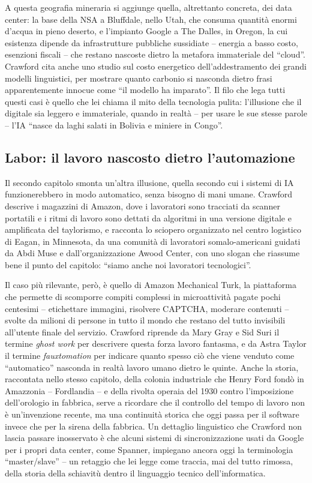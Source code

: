 \documentclass[a4paper,11pt]{article}
\begin{document}
A questa geografia mineraria si aggiunge quella, altrettanto concreta, dei data center: la base della NSA a Bluffdale, nello Utah, che consuma quantità enormi d'acqua in pieno deserto, e l'impianto Google a The Dalles, in Oregon, la cui esistenza dipende da infrastrutture pubbliche sussidiate -- energia a basso costo, esenzioni fiscali -- che restano nascoste dietro la metafora immateriale del ``cloud''. Crawford cita anche uno studio sul costo energetico dell'addestramento dei grandi modelli linguistici, per mostrare quanto carbonio si nasconda dietro frasi apparentemente innocue come ``il modello ha imparato''. Il filo che lega tutti questi casi è quello che lei chiama il mito della tecnologia pulita: l'illusione che il digitale sia leggero e immateriale, quando in realtà -- per usare le sue stesse parole -- l'IA ``nasce da laghi salati in Bolivia e miniere in Congo''.

\subsection{Labor: il lavoro nascosto dietro l'automazione}

Il secondo capitolo smonta un'altra illusione, quella secondo cui i sistemi di IA funzionerebbero in modo automatico, senza bisogno di mani umane. Crawford descrive i magazzini di Amazon, dove i lavoratori sono tracciati da scanner portatili e i ritmi di lavoro sono dettati da algoritmi in una versione digitale e amplificata del taylorismo, e racconta lo sciopero organizzato nel centro logistico di Eagan, in Minnesota, da una comunità di lavoratori somalo-americani guidati da Abdi Muse e dall'organizzazione Awood Center, con uno slogan che riassume bene il punto del capitolo: ``siamo anche noi lavoratori tecnologici''.

Il caso più rilevante, però, è quello di Amazon Mechanical Turk, la piattaforma che permette di scomporre compiti complessi in microattività pagate pochi centesimi -- etichettare immagini, risolvere CAPTCHA, moderare contenuti -- svolte da milioni di persone in tutto il mondo che restano del tutto invisibili all'utente finale del servizio. Crawford riprende da Mary Gray e Sid Suri il termine \emph{ghost work} per descrivere questa forza lavoro fantasma, e da Astra Taylor il termine \emph{fauxtomation} per indicare quanto spesso ciò che viene venduto come ``automatico'' nasconda in realtà lavoro umano dietro le quinte. Anche la storia, raccontata nello stesso capitolo, della colonia industriale che Henry Ford fondò in Amazzonia -- Fordlandia -- e della rivolta operaia del 1930 contro l'imposizione dell'orologio in fabbrica, serve a ricordare che il controllo del tempo di lavoro non è un'invenzione recente, ma una continuità storica che oggi passa per il software invece che per la sirena della fabbrica. Un dettaglio linguistico che Crawford non lascia passare inosservato è che alcuni sistemi di sincronizzazione usati da Google per i propri data center, come Spanner, impiegano ancora oggi la terminologia ``master/slave'' -- un retaggio che lei legge come traccia, mai del tutto rimossa, della storia della schiavitù dentro il linguaggio tecnico dell'informatica.
\end{document}
